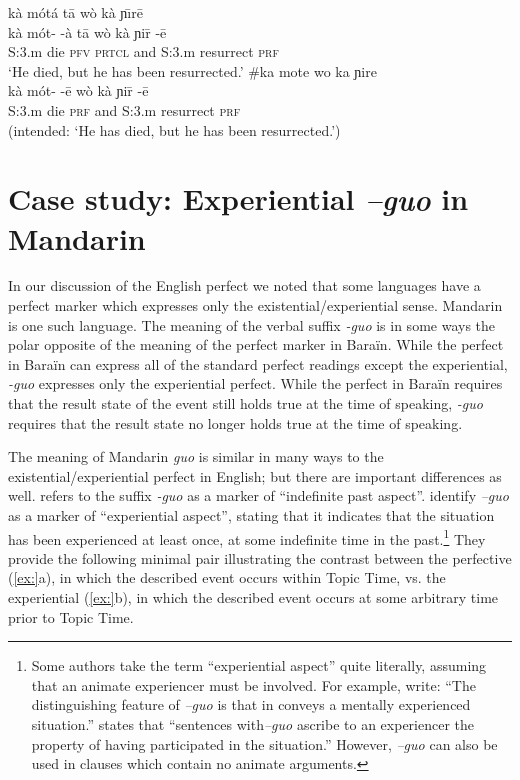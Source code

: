 \ea
\ea  \glll kà  mótá    tā  wò  kà  ɲ\={\i}rē\\
kà  mót-  -à  tā  wò  kà  ɲi\={r}  -ē\\
S:3.m  die  \textsc{pfv}  \textsc{prtcl}  and  S:3.m  resurrect  \textsc{prf}\\
\glt ‘He died, but he has been resurrected.’
\ex \glll  \#ka  mote    wo  ka  ɲire\\
  kà  mót-  -ē  wò  kà  ɲi\={r}  -ē\\
S:3.m  die  \textsc{prf}  and  S:3.m  resurrect  \textsc{prf}\\
\glt (intended: ‘He has died, but he has been resurrected.’)
\z \z

\section{Case study: Experiential \textit{–guo} in Mandarin}\label{sec:22.6}

In our discussion of the English perfect we noted that some languages have a perfect marker which expresses only the existential/experiential sense. Mandarin is one such language. The meaning of the verbal suffix \textit{-guo} is in some ways the polar opposite of the meaning of the perfect marker in Baraïn. While the perfect in Baraïn can express all of the standard perfect readings except the experiential, \textit{-guo} expresses only the experiential perfect. While the perfect in Baraïn requires that the result state of the event still holds true at the time of speaking, \textit{-guo} requires that the result state no longer holds true at the time of speaking.



The meaning of Mandarin \textit{guo} is similar in many ways to the existential/experiential perfect in English; but there are important differences as well. \citet{Chao1968} refers to the suffix \textit{-guo} as a marker of “indefinite past aspect”. \citet[226]{LiThompson1981} identify \textit{–guo} as a marker of “experiential aspect”, stating that it indicates that the situation has been experienced at least once, at some indefinite time in the past.\footnote{Some authors take the term “experiential aspect” quite literally, assuming that an animate experiencer must be involved. For example, \citet[144]{XiaoMcEnery2004} write: “The distinguishing feature of \textit{–guo} is that in conveys a mentally experienced situation.” \citet[267]{Smith1997} states that “sentences with\textit{–guo} ascribe to an experiencer the property of having participated in the situation.” However, \textit{–guo} can also be used in clauses which contain no animate arguments.} They provide the following minimal pair illustrating the contrast between the perfective (\ref{ex:}a), in which the described event occurs within Topic Time, vs. the experiential (\ref{ex:}b), in which the described event occurs at some arbitrary time prior to Topic Time.


